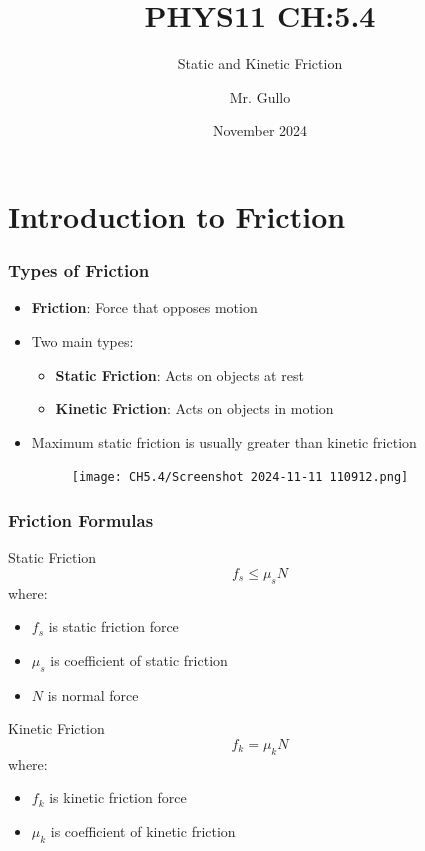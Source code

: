 \documentclass{beamer}
\title[Inclined Planes]{PHYS11 CH:5.4}
\subtitle{Static and Kinetic Friction}
\author[Mr. Gullo]{Mr. Gullo}
\date[Nov 2024]{November 2024}
\begin{document}
\frame{\titlepage}

\section{Introduction to Friction}

\begin{frame}
\frametitle{Types of Friction}
\begin{itemize}
    \item \textbf{Friction}: Force that opposes motion
    \item Two main types:
    \begin{itemize}
        \item \textbf{Static Friction}: Acts on objects at rest
        \item \textbf{Kinetic Friction}: Acts on objects in motion
    \end{itemize}
    \item Maximum static friction is usually greater than kinetic friction
\begin{figure}[H]
    \centering
    \texttt{[image: CH5.4/Screenshot 2024-11-11 110912.png]}
\end{figure}
    
\end{itemize}
\end{frame}

\begin{frame}
\frametitle{Friction Formulas}
\begin{block}{Static Friction}
\[ f_s \leq \mu_s N \]
where:
\begin{itemize}
    \item $f_s$ is static friction force
    \item $\mu_s$ is coefficient of static friction
    \item $N$ is normal force
\end{itemize}
\end{block}

\begin{block}{Kinetic Friction}
\[ f_k = \mu_k N \]
where:
\begin{itemize}
    \item $f_k$ is kinetic friction force
    \item $\mu_k$ is coefficient of kinetic friction
\end{itemize}
\end{block}
\end{frame}
\end{document}
